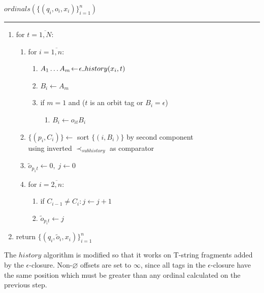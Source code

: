 \documentclass{article}
\newcommand{\Xset}{\!\leftarrow\!}
\newcommand{\Xund}{\rule{.4em}{.4pt}} %
\newcommand{\Xeq}{\!=\!}
\theoremstyle{definition}
\begin{document}
\begin{multicols}{2}
    $ordinals (\{(q_i, o_i, x_i)\}_{i=1}^n)$
    \hrule
    \begin{enumerate}[leftmargin=0in]
        \smallskip
        \item[] for $t \Xeq \overline{1, N}$:
        \begin{enumerate}
            \item[] for $i \Xeq \overline{1, n}$:
            \begin{enumerate}
                \item[] $A_1 \dots A_m \Xset \epsilon \Xund history(x_i, t)$
                \item[] $B_i \Xset A_m$
                \item[] if $m \Xeq 1$ and ($t$ is an orbit tag or $B_i \Xeq \epsilon$)
                \begin{enumerate}
                    \item[] $B_i \Xset o_{i t} B_i$
                \end{enumerate}
            \end{enumerate}
            \smallskip
            \item[] $\{(p_i, C_i)\} \Xset $ sort $\{(i, B_i)\}$ by second component \\
                \hphantom{\quad} using inverted $\prec_{subhistory}$ as comparator
            \item[] $\widetilde{o}_{p_1 t} \Xset 0, \; j \Xset 0$
            \item[] for $i \Xeq \overline{2, n}$:
            \begin{enumerate}
                \item[] if $C_{i-1} \!\neq\! C_i: j \Xset j \!+\! 1$
                \item[] $\widetilde{o}_{p_i t} \Xset j$
            \end{enumerate}
        \end{enumerate}
        \smallskip
        \item[] return $\{(q_i, \widetilde{o}_i, x_i)\}_{i=1}^n$
        \\
    \end{enumerate}

    \bigskip

The $history$ algorithm is modified so that it works on T-string fragments added by the $\epsilon$-closure.
Non-$\varnothing$ offsets are set to $\infty$, since all tags in the $\epsilon$-closure have the same position
which must be greater than any ordinal calculated on the previous step.
\\


\end{multicols}
\end{document}

